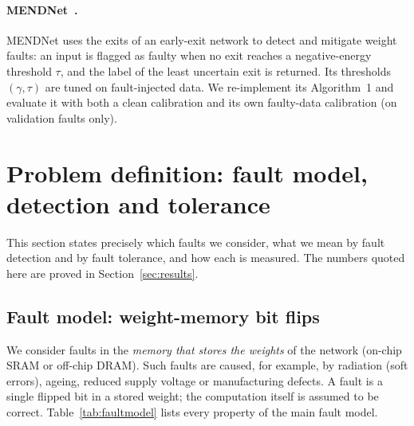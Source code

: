 \documentclass[10pt,a4paper]{article}
\begin{document}
\paragraph{MENDNet~\cite{mendnet}.} MENDNet uses the exits of an early-exit network to detect and
mitigate weight faults: an input is flagged as faulty when no exit reaches a negative-energy threshold
$\tau$, and the label of the least uncertain exit is returned. Its thresholds $(\gamma,\tau)$ are tuned on
fault-injected data. We re-implement its Algorithm~1 and evaluate it with both a clean calibration and
its own faulty-data calibration (on validation faults only).

\section{Problem definition: fault model, detection and tolerance}\label{sec:problem}

This section states precisely which faults we consider, what we mean by fault detection and by fault
tolerance, and how each is measured. The numbers quoted here are proved in Section~\ref{sec:results}.

\subsection{Fault model: weight-memory bit flips}\label{sec:faultmodel}

We consider faults in the \emph{memory that stores the weights} of the network (on-chip SRAM or off-chip
DRAM). Such faults are caused, for example, by radiation (soft errors), ageing, reduced supply voltage or
manufacturing defects. A fault is a single flipped bit in a stored weight; the computation itself is
assumed to be correct. Table~\ref{tab:faultmodel} lists every property of the main fault model.
\end{document}
